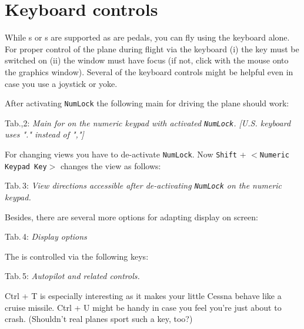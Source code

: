 \section{Keyboard controls}

While s or s are supported as are 
pedals, you
can fly \FlightGear{} using the keyboard alone. For proper control of the plane
during
flight via the keyboard (i) the \texttt{} key must be switched on
(ii) the
\FlightGear{} window must have focus (if not, click with the mouse onto the
graphics
window). Several of the keyboard controls might be helpful even in case you use
a
joystick or yoke.

After activating \texttt{NumLock} the following main 
for driving the plane should work:
 \eject

\noindent
 Tab.,2: \textit{Main  for \FlightGear{} on the
 numeric keypad with activated \texttt{NumLock}.
 [U.S. keyboard uses "." instead of ","]}
\medskip

\centerline{}
\vskip 5mm

For changing views you have to de-activate \texttt{NumLock}. Now \texttt{Shift}
+
$<$\texttt{Numeric Keypad Key}$>$ changes the view as follows:
\medskip

\noindent
 Tab.\,3: \textit{View directions
accessible after de-activating \texttt{NumLock} on the numeric keypad.}
\medskip

\centerline{}
\vskip 5mm
Besides, there are several more options for adapting display on screen:
\vfill
\eject

\noindent
 Tab.\,4: \textit{Display options}
\medskip

\centerline{}
\vskip 5mm

The  is controlled via the following keys:
\medskip

\noindent
 Tab.\,5: \textit{Autopilot and related controls.}
\medskip

\centerline{}
\medskip

\noindent Ctrl + T is especially interesting as it makes your little Cessna
behave
like a cruise missile. Ctrl + U might be handy in case you feel you're just
about to
crash. (Shouldn't real planes sport such a key, too?)

